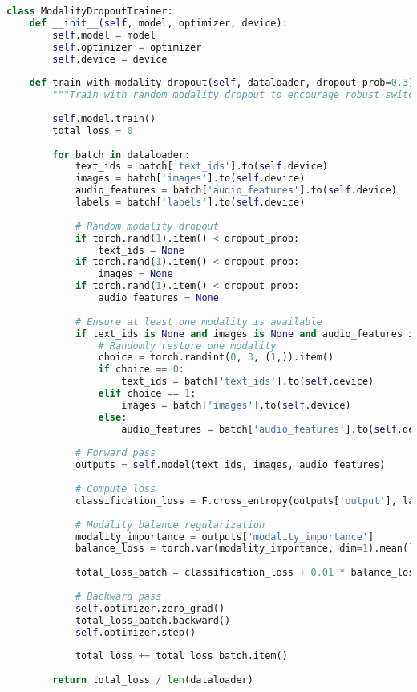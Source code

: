 \begin{lstlisting}[language=Python, caption=Training with modality dropout and switching]
class ModalityDropoutTrainer:
    def __init__(self, model, optimizer, device):
        self.model = model
        self.optimizer = optimizer
        self.device = device
        
    def train_with_modality_dropout(self, dataloader, dropout_prob=0.3):
        """Train with random modality dropout to encourage robust switching."""
        
        self.model.train()
        total_loss = 0
        
        for batch in dataloader:
            text_ids = batch['text_ids'].to(self.device)
            images = batch['images'].to(self.device)
            audio_features = batch['audio_features'].to(self.device)
            labels = batch['labels'].to(self.device)
            
            # Random modality dropout
            if torch.rand(1).item() < dropout_prob:
                text_ids = None
            if torch.rand(1).item() < dropout_prob:
                images = None
            if torch.rand(1).item() < dropout_prob:
                audio_features = None
            
            # Ensure at least one modality is available
            if text_ids is None and images is None and audio_features is None:
                # Randomly restore one modality
                choice = torch.randint(0, 3, (1,)).item()
                if choice == 0:
                    text_ids = batch['text_ids'].to(self.device)
                elif choice == 1:
                    images = batch['images'].to(self.device)
                else:
                    audio_features = batch['audio_features'].to(self.device)
            
            # Forward pass
            outputs = self.model(text_ids, images, audio_features)
            
            # Compute loss
            classification_loss = F.cross_entropy(outputs['output'], labels)
            
            # Modality balance regularization
            modality_importance = outputs['modality_importance']
            balance_loss = torch.var(modality_importance, dim=1).mean()
            
            total_loss_batch = classification_loss + 0.01 * balance_loss
            
            # Backward pass
            self.optimizer.zero_grad()
            total_loss_batch.backward()
            self.optimizer.step()
            
            total_loss += total_loss_batch.item()
        
        return total_loss / len(dataloader)
\end{lstlisting}

